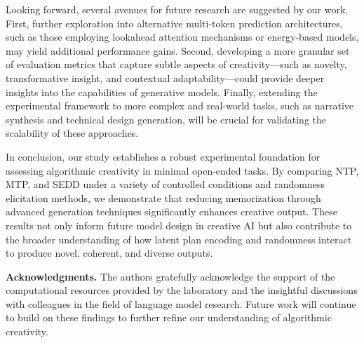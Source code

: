 \documentclass[12pt]{article}
\begin{document}
Looking forward, several avenues for future research are suggested by our work. First, further exploration into alternative multi-token prediction architectures, such as those employing lookahead attention mechanisms or energy-based models, may yield additional performance gains. Second, developing a more granular set of evaluation metrics that capture subtle aspects of creativity—such as novelty, transformative insight, and contextual adaptability—could provide deeper insights into the capabilities of generative models. Finally, extending the experimental framework to more complex and real-world tasks, such as narrative synthesis and technical design generation, will be crucial for validating the scalability of these approaches.

In conclusion, our study establishes a robust experimental foundation for assessing algorithmic creativity in minimal open‐ended tasks. By comparing NTP, MTP, and SEDD under a variety of controlled conditions and randomness elicitation methods, we demonstrate that reducing memorization through advanced generation techniques significantly enhances creative output. These results not only inform future model design in creative AI but also contribute to the broader understanding of how latent plan encoding and randomness interact to produce novel, coherent, and diverse outputs.

\vspace{1em}
\noindent\textbf{Acknowledgments.} The authors gratefully acknowledge the support of the computational resources provided by the laboratory and the insightful discussions with colleagues in the field of language model research. Future work will continue to build on these findings to further refine our understanding of algorithmic creativity.
\end{document}
